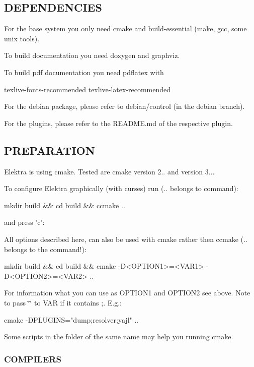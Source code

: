 \subsection*{D\+E\+P\+E\+N\+D\+E\+N\+C\+I\+E\+S}

For the base system you only need cmake and build-\/essential (make, gcc, some unix tools).

To build documentation you need doxygen and graphviz.

To build pdf documentation you need pdflatex with \begin{DoxyVerb}    texlive-fonts-recommended
    texlive-latex-recommended
\end{DoxyVerb}


For the debian package, please refer to debian/control (in the debian branch).

For the plugins, please refer to the R\+E\+A\+D\+M\+E.\+md of the respective plugin.

\subsection*{P\+R\+E\+P\+A\+R\+A\+T\+I\+O\+N}

Elektra is using cmake. Tested are cmake version 2.. and version 3...

To configure Elektra graphically (with curses) run (.. belongs to command)\+: \begin{DoxyVerb}    mkdir build && cd build && ccmake ..
\end{DoxyVerb}


and press 'c'\+:

All options described here, can also be used with cmake rather then ccmake (.. belongs to the command!)\+: \begin{DoxyVerb}    mkdir build && cd build && cmake -D<OPTION1>=<VAR1> -D<OPTION2>=<VAR2> ..
\end{DoxyVerb}


For information what you can use as O\+P\+T\+I\+O\+N1 and O\+P\+T\+I\+O\+N2 see above. Note to pass \char`\"{}\char`\"{} to V\+A\+R if it contains ;. E.\+g.\+: \begin{DoxyVerb}    cmake -DPLUGINS="dump;resolver;yajl" ..
\end{DoxyVerb}


Some scripts in the folder of the same name may help you running cmake.

\subsubsection*{C\+O\+M\+P\+I\+L\+E\+R\+S}

